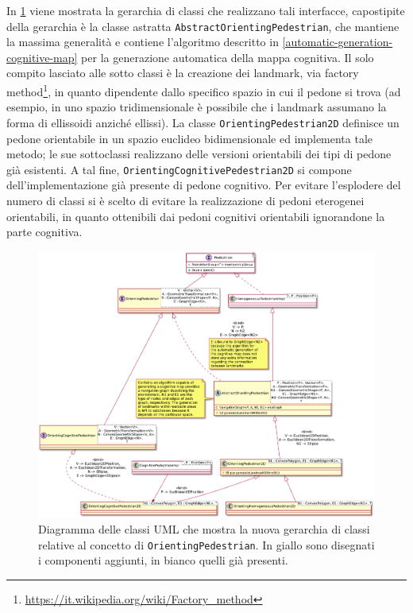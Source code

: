 \documentclass[12pt,a4paper,openright,oneside]{book}
\begin{document}
In \cref{fig:orienting-pedestrian-classes} viene mostrata la gerarchia di classi che realizzano tali interfacce, capostipite della gerarchia è la classe astratta \texttt{AbstractOrientingPedestrian}, che mantiene la massima generalità e contiene l'algoritmo descritto in \ref{automatic-generation-cognitive-map} per la generazione automatica della mappa cognitiva. Il solo compito lasciato alle sotto classi è la creazione dei landmark, via factory method\footnote{\url{https://it.wikipedia.org/wiki/Factory_method}}, in quanto dipendente dallo specifico spazio in cui il pedone si trova (ad esempio, in uno spazio tridimensionale è possibile che i landmark assumano la forma di ellissoidi anziché ellissi). La classe \texttt{OrientingPedestrian2D} definisce un pedone orientabile in un spazio euclideo bidimensionale ed implementa tale metodo; le sue sottoclassi realizzano delle versioni orientabili dei tipi di pedone già esistenti. A tal fine, \texttt{OrientingCognitivePedestrian2D} si compone dell'implementazione già presente di pedone cognitivo. Per evitare l'esplodere del numero di classi si è scelto di evitare la realizzazione di pedoni eterogenei orientabili, in quanto ottenibili dai pedoni cognitivi orientabili ignorandone la parte cognitiva. 
\begin{figure}
	\centering
	\includegraphics[width=\linewidth]{figures/orienting-pedestrian-classes.pdf}
	\caption{Diagramma delle classi UML che mostra la nuova gerarchia di classi relative al concetto di \texttt{OrientingPedestrian}. In giallo sono disegnati i componenti aggiunti, in bianco quelli già presenti.}
	\label{fig:orienting-pedestrian-classes}
\end{figure}
\end{document}
